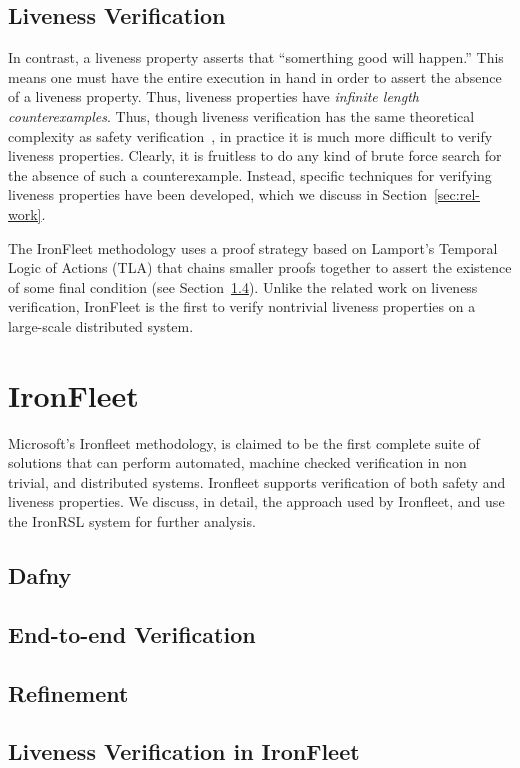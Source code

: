 \documentclass{llncs}
\begin{document}
\subsection{Liveness Verification}
In contrast, a liveness property asserts that ``somerthing good will happen.''
This means one must have the entire execution in hand in order to assert the
absence of a liveness property. Thus, liveness properties have \textit{infinite
  length counterexamples}.  Thus, though liveness verification has the same
theoretical complexity as safety verification~\cite{simulation-liveness}, in
practice it is much more difficult to verify liveness properties. Clearly, it is
fruitless to do any kind of brute force search for the absence of such a
counterexample. Instead, specific techniques for verifying liveness properties
have been developed, which we discuss in Section~\ref{sec:rel-work}.

The IronFleet methodology uses a proof strategy based on Lamport's Temporal
Logic of Actions (TLA) that chains smaller proofs together to assert the
existence of some final condition (see
Section~\ref{sec:liveness-ironfleet}). Unlike the related work on liveness
verification, IronFleet is the first to verify nontrivial liveness properties on
a large-scale distributed system.
%
\section{IronFleet}
Microsoft's Ironfleet methodology, is claimed to be the first complete suite of 
solutions that can perform automated, machine checked verification 
in non trivial, and distributed systems. Ironfleet supports 
verification of both safety and liveness properties. We discuss, in detail, the 
approach used by Ironfleet, and use the IronRSL system for further analysis.
\subsection{Dafny}
\subsection{End-to-end Verification}
\subsection{Refinement}
\subsection{Liveness Verification in IronFleet}\label{sec:liveness-ironfleet}
\end{document}
